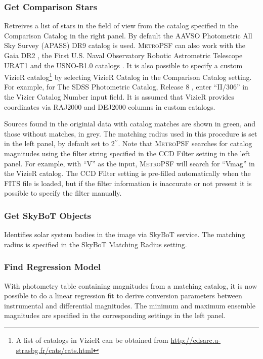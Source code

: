\documentclass{article}
\newcommand\arcsec{\mbox{$^{\prime\prime}$}}%
\begin{document}
\subsubsection{Get Comparison Stars}
Retreives a list of stars in the field of view from the catalog specified in the Comparison Catalog in the right panel. By default the AAVSO Photometric All Sky Survey (APASS) DR9 catalog \citep{2015AAS...22533616H} is used. \textsc{MetroPSF} can also work with the Gaia DR2 \citep{2018A&A...616A...1G}, the First U.S. Naval Observatory Robotic Astrometric Telescope URAT1 \citep{2015AJ....150..101Z} and the USNO-B1.0 catalogs \citep{2003AJ....125..984M}. It is also possible to specify a custom VizieR catalog\footnote{A list of catalogs in VizieR can be obtained from \url{http://cdsarc.u-strasbg.fr/cats/cats.html}} by selecting VizieR Catalog in the Comparison Catalog setting. For example, for The SDSS Photometric Catalog, Release 8 \citep{2011yCat.2306....0A}, enter ``II/306'' in the Vizier Catalog Number input field. It is assumed that VizieR provides coordinates via RAJ2000 and DEJ2000 columns in custom catalogs.

Sources found in the originial data with catalog matches are shown in green, and those without matches, in grey. The matching radius used in this procedure is set in the left panel, by default set to 2\arcsec. Note that \textsc{MetroPSF} searches for catalog magnitudes using the filter string specified in the CCD Filter setting in the left panel. For example, with ``V'' as the input, \textsc{MetroPSF} will search for ``Vmag'' in the VizieR catalog. The CCD Filter setting is pre-filled automatically when the FITS file is loaded, but if the filter information is inaccurate or not present it is possible to specify the filter manually.

\subsubsection{Get SkyBoT Objects}
Identifies solar system bodies in the image via SkyBoT service. The matching radius is specified in the SkyBoT Matching Radius setting. 

\subsubsection{Find Regression Model}
With photometry table containing magnitudes from a matching catalog, it is now possible to do a linear regression fit to derive conversion parameters between instrumental and differential magnitudes. The minimum and maximum ensemble magnitudes are specified in the corresponding settings in the left panel. 
\end{document}
